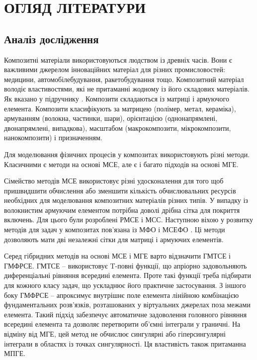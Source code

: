 \chapter{ОГЛЯД ЛІТЕРАТУРИ}

\nocite{bahvalov-et-al,tumor-thermal-model,lung-tumor-thermal-conductivity,database-tissue-properties} 


\section{Аналіз дослідження}

Композитні матеріали використовуються людством із древніх часів. Вони є важливими джерелом інноваційних матеріал для
різних промисловостей: медицини, автомобілебудування, ракетобудування тощо. Композитний матеріал володіє властивостями,
які не притаманні жодному із його складових матеріалів. Як вказано у підручнику \cite{lubin-2013-handbook}. Композити
складаються із матриці і армуючого елемента. Композити класифікують за матрицею (полімер, метал, кераміка), армуванням
(волокна, частинки, шари), орієнтацією (однонапрямлені, двонапрямлені, випадкова), масштабом (макрокомпозити,
мікрокомпозити, нанокомпозити) і призначенням.

Для моделювання фізичних процесів у композитах використовують різні методи. Класичними є методи на основі МСЕ, але є і 
багато підходів на основі МГЕ.

Сімейство методів МСЕ використовує різні удосконалення для того щоб пришвидшити обчислення або зменшити кількість
обчислювальних ресурсів необхідних для моделювання композитних матеріалів різних типів. У випадку із волокнистим
армуючим елементом потрібна доволі дрібна сітка для покриття включень. Для цього були розроблені РМСЕ
\cite{grappein-2024-article-review} і МСС. Наступною віхою у розвитку методів для задач у композитах пов'язана із МФО і
МСЕФО \cite{he-2025-article-review}. Ці методи дозволяють мати дві незалежні сітки для матриці і армуючих елементів.

Серед гібридних методів на основі МСЕ і МГЕ варто відзначити ГМТСЕ і ГМФРСЕ. ГМТСЕ \cite{qin-2005-article-review} --
використовує T-повні функції, що апріорно задовольняють диференціальні рівняння всередині елемента. Проте такі функції
треба підбирати для кожного класу задач, що ускладнює його практичне застосування. З іншого боку ГМФРСЕ
\cite{wang-2009-article-review} -- апроксимує внутрішнє поле елемента лінійною комбінацією фундаментальних розв'язків,
розташованих у віртуальних джерелах поза межами елемента. Такий підхід забезпечує автоматичне задоволення головного
рівняння всередині елемента та дозволяє перетворити об’ємні інтеграли у граничні. На відміну від МГЕ, цей метод не
обчислює сингулярні або гіперсингулярні інтеграли в областях із точках сингулярності. Ця властивість також притаманна
МПГЕ.

